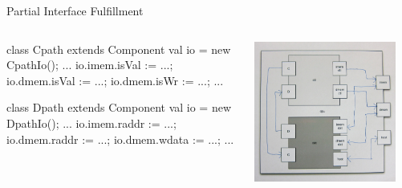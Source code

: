 \documentclass[xcolor=pdflatex,dvipsnames,table]{beamer}
\begin{document}
\begin{frame}[fragile]{Partial Interface Fulfillment}
\begin{columns}

\begin{scala}
class Cpath extends Component {
  val io = new CpathIo();
  ...
  io.imem.isVal := ...;
  io.dmem.isVal := ...;
  io.dmem.isWr  := ...;
  ...
}

class Dpath extends Component {
  val io = new DpathIo();
  ...
  io.imem.raddr := ...;
  io.dmem.raddr := ...;
  io.dmem.wdata := ...;
  ...
}
\end{scala}


\begin{center}
\includegraphics[width=0.9\textwidth]{../tutorial/figs/cpu.png} 
\end{center}

\end{columns}
\end{frame}
\end{document}
